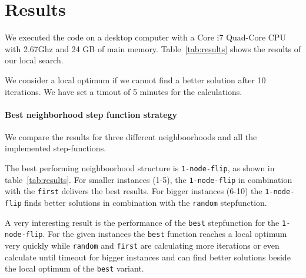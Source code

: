 \documentclass{scrartcl}
\begin{document}


\section{Results}

We executed the code on a desktop computer with a Core i7 Quad-Core
CPU with 2.67Ghz and 24 GB of main memory. Table~\ref{tab:results}
shows the results of our local search. 

We consider a local optimum if we cannot find a better solution after 10 iterations.
We have set a timout of 5 minutes for the calculations.

\paragraph{Best neighborhood step function strategy}

We compare the results for
three different neighboorhoods and all the implemented step-functions.

The best performing neighboorhood structure is \texttt{1-node-flip}, as
shown in table~\ref{tab:results}.
For smaller instances (1-5), the \texttt{1-node-flip} in combination with 
the \texttt{first} delivers the best results.
For bigger instances (6-10) the \texttt{1-node-flip}  finds 
better solutions in combination with the \texttt{random} stepfunction.



A very interesting result is the performance of the \texttt{best} stepfunction
for the \texttt{1-node-flip}. For the given instances the \texttt{best} function
reaches a local optimum very quickly while \texttt{random} and \texttt{first} 
are calculating more iterations or even calculate until timeout for bigger
instances and can find better solutions beside the local optimum of the \texttt{best} 
variant.
%
\end{document}
